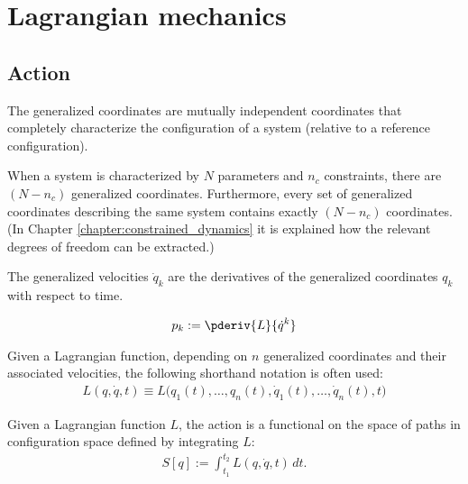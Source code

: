 
\section{Lagrangian mechanics}
\subsection{Action}

    \begin{definition}
        The generalized coordinates are mutually independent coordinates that completely characterize the configuration of a system (relative to a reference configuration).

        When a system is characterized by $N$ parameters and $n_c$ constraints, there are $(N-n_c)$ generalized coordinates. Furthermore, every set of generalized coordinates describing the same system contains exactly $(N-n_c)$ coordinates. (In Chapter \ref{chapter:constrained_dynamics} it is explained how the relevant degrees of freedom can be extracted.)
    \end{definition}
    \begin{definition}
        The generalized velocities $\dot{q}_k$ are the derivatives of the generalized coordinates $q_k$ with respect to time.
    \end{definition}
    \begin{definition}\label{lagrange:conjugate_momentum}
        \begin{gather}
            p_k := \pderiv{L}{\dot{q}^k}
        \end{gather}
    \end{definition}

    \begin{notation}\label{lagrange:notational_convention_1}
        Given a Lagrangian function, depending on $n$ generalized coordinates and their associated velocities, the following shorthand notation is often used:
        \begin{gather}
            L(q,\dot{q},t)\equiv L\big(q_1(t),\ldots,q_n(t),\dot{q}_1(t),\ldots,\dot{q}_n(t),t\big)
        \end{gather}
    \end{notation}
    \begin{definition}[Action]\label{lagrange:action}
        Given a Lagrangian function $L$, the action is a functional on the space of paths in configuration space defined by integrating $L$:
        \begin{gather}
            S[q] := \int_{t_1}^{t_2}L(q,\dot{q},t)\,dt.
        \end{gather}
    \end{definition}

